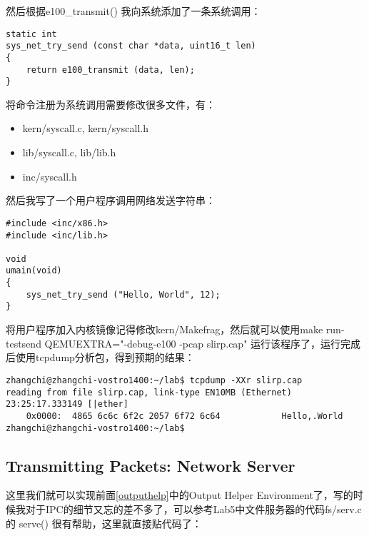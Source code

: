 \documentclass{article}
\newcommand{\funcname}[1]{{\ttfamily \small #1}}
\begin{document}
\begin{CJK*}{UTF8}{gkai}
\begin{description}
\begin{itemize}
\end{itemize}

\end{description}

然后根据\funcname{e100\_transmit()} 我向系统添加了一条系统调用：

\begin{lstlisting}[style=ccode, title={\scriptsize \ttfamily \bfseries kern/syscall.c: sys\_net\_try\_send()}]
static int
sys_net_try_send (const char *data, uint16_t len)
{
    return e100_transmit (data, len);
}
\end{lstlisting}

将命令注册为系统调用需要修改很多文件，有：

\begin{itemize}
\item{kern/syscall.c, kern/syscall.h}
\item{lib/syscall.c, lib/lib.h}
\item{inc/syscall.h}
\end{itemize}

然后我写了一个用户程序调用网络发送字符串：

\begin{lstlisting}[style=ccode, title={\scriptsize \ttfamily \bfseries user/testsend.c}]
#include <inc/x86.h>
#include <inc/lib.h>

void
umain(void)
{
    sys_net_try_send ("Hello, World", 12);
}
\end{lstlisting}

将用户程序加入内核镜像记得修改kern/Makefrag，然后就可以使用make run-testsend QEMUEXTRA="-debug-e100 -pcap slirp.cap" 运行该程序了，运行完成后使用tcpdump分析包，得到预期的结果：

\begin{lstlisting}[style=console]
zhangchi@zhangchi-vostro1400:~/lab$ tcpdump -XXr slirp.cap
reading from file slirp.cap, link-type EN10MB (Ethernet)
23:25:17.333149 [|ether]
	0x0000:  4865 6c6c 6f2c 2057 6f72 6c64            Hello,.World
zhangchi@zhangchi-vostro1400:~/lab$ 

\end{lstlisting}


\subsection{Transmitting Packets: Network Server}

这里我们就可以实现前面\ref{outputhelp}中的Output Helper Environment了，写的时候我对于IPC的细节又忘的差不多了，可以参考Lab5中文件服务器的代码fs/serv.c的 \funcname{serve()} 很有帮助，这里就直接贴代码了：


\end{CJK*}
\end{document}
